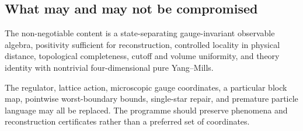 \subsection{What may and may not be compromised}

The non-negotiable content is a state-separating gauge-invariant observable
algebra, positivity sufficient for reconstruction, controlled locality in
physical distance, topological completeness, cutoff and volume uniformity,
and theory identity with nontrivial four-dimensional pure Yang--Mills.

The regulator, lattice action, microscopic gauge coordinates, a particular
block map, pointwise worst-boundary bounds, single-star repair, and premature
particle language may all be replaced.  The programme should preserve
phenomena and reconstruction certificates rather than a preferred set of
coordinates.
